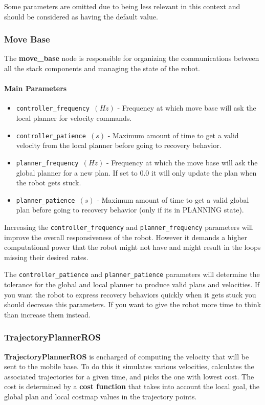 \documentclass[12pt]{article}
\begin{document}
Some parameters are omitted due to being less relevant in this context and should be considered as having the default value.
\subsubsection{Move Base}
The \textbf{move\_base} node is responsible for organizing the communications between all the stack components and managing the state of the robot.
\paragraph{Main Parameters}
\begin{itemize}[label={}]
    \item \texttt{controller\_frequency $(Hz)$} - Frequency at which move base will ask the local planner for velocity commands.
    \item \texttt{controller\_patience $(s)$} - Maximum amount of time to get a valid velocity from the local planner before going to recovery behavior.
    \item \texttt{planner\_frequency $(Hz)$} - Frequency at which the move base will ask the global planner for a new plan. If set to 0.0 it will only update the plan when the robot gets stuck.
    \item \texttt{planner\_patience $(s)$} - Maximum amount of time to get a valid global plan before going to recovery behavior (only if its in PLANNING state).
\end{itemize}

Increasing the \texttt{controller\_frequency} and \texttt{planner\_frequency} parameters will improve the overall responsiveness of the robot. However it demands a higher computational power that the robot might not have and might result in the loops missing their desired rates.

The \texttt{controller\_patience} and \texttt{planner\_patience} parameters will determine the tolerance for the global and local planner to produce valid plans and velocities. If you want the robot to express recovery behaviors quickly when it gets stuck you should decrease this parameters. If you want to give the robot more time to think than increase them instead.

\subsubsection{TrajectoryPlannerROS}

\textbf{TrajectoryPlannerROS} is encharged of computing the velocity that will be sent to the mobile base. To do this it simulates various velocities, calculates the associated trajectories for a given time, and picks the one with lowest cost. The cost is determined by a \textbf{cost function} that takes into account the local goal, the global plan and local costmap values in the trajectory points.
\end{document}
